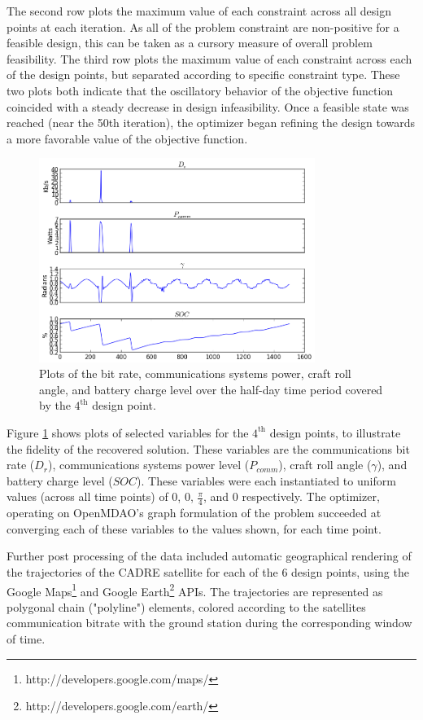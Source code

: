 \documentclass[]{aiaa-tc} %
\begin{document}
The second row plots the maximum value of each constraint across all design points at
each iteration. As all of the problem constraint are non-positive for a feasible design,
this can be taken as a cursory measure of overall problem feasibility.
The third row plots the maximum value of each constraint across each of the design points,
but separated according to specific constraint type. These two plots both indicate that the
oscillatory behavior of the objective function coincided with a steady decrease in design
infeasibility. Once a feasible state was reached (near the 50th iteration), the optimizer
began refining the design towards a more favorable value of the objective function.

\begin{figure}
\centering
\includegraphics[width=0.8\textwidth]{images/pt_3_data.png}
\caption[width=0.4\textwidth]{Plots of the bit rate, communications systems power, craft roll angle,
and battery charge level over the half-day time period covered by the $4^{\textrm{th}}$ design point.}
\label{pt3_data_results}
\end{figure}

Figure \ref{pt3_data_results} shows plots of selected variables for the $4^{\textrm{th}}$ design points,
to illustrate the fidelity of the recovered solution. These variables are the communications bit rate ($D_r$), communications systems power level ($P_{comm}$), craft roll angle ($\gamma$),
and battery charge level ($SOC$). These variables were each instantiated to uniform values
(across all time points) of 0, 0, $\frac{\pi}{4}$, and 0 respectively. The optimizer, operating on
OpenMDAO's graph formulation of the problem succeeded at converging each of these variables to the values
shown, for each time point.

Further post processing of the data included automatic geographical rendering of the trajectories of
the CADRE satellite for each of the 6 design points, using the Google
Maps\footnote{http://developers.google.com/maps/} and Google
Earth\footnote{http://developers.google.com/earth/} APIs. The trajectories are
represented as polygonal chain ("polyline") elements, colored according to the
satellites communication bitrate with the ground station during the corresponding
window of time.
\end{document}
